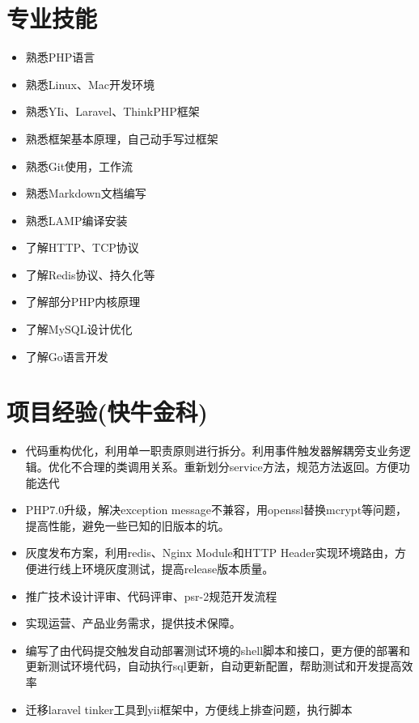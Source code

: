 \documentclass[a4paper,12pt]{article}
\begin{document}
\begin{CJK}{UTF8}{gbsn}
		\section{专业技能}
			\begin{itemize}
				\item{熟悉PHP语言}
				\item{熟悉Linux、Mac开发环境}
				\item{熟悉YIi、Laravel、ThinkPHP框架}
				\item{熟悉框架基本原理，自己动手写过框架}
				\item{熟悉Git使用，工作流}
				\item{熟悉Markdown文档编写}
				\item{熟悉LAMP编译安装}
				\item{了解HTTP、TCP协议}
				\item{了解Redis协议、持久化等}
				\item{了解部分PHP内核原理}
				\item{了解MySQL设计优化}
				\item{了解Go语言开发}
			\end{itemize}
		
		\section{项目经验(快牛金科)}
			\begin{itemize}
				\item{代码重构优化，利用单一职责原则进行拆分。利用事件触发器解耦旁支业务逻辑。优化不合理的类调用关系。重新划分service方法，规范方法返回。方便功能迭代}
				\item{PHP7.0升级，解决exception message不兼容，用openssl替换mcrypt等问题，提高性能，避免一些已知的旧版本的坑。}
				\item{灰度发布方案，利用redis、Nginx Module和HTTP Header实现环境路由，方便进行线上环境灰度测试，提高release版本质量。}
				\item{推广技术设计评审、代码评审、psr-2规范开发流程}
				\item{实现运营、产品业务需求，提供技术保障。}
				\item{编写了由代码提交触发自动部署测试环境的shell脚本和接口，更方便的部署和更新测试环境代码，自动执行sql更新，自动更新配置，帮助测试和开发提高效率}
				\item{迁移laravel tinker工具到yii框架中，方便线上排查问题，执行脚本}
			\end{itemize}
			

\end{CJK}
\end{document}
